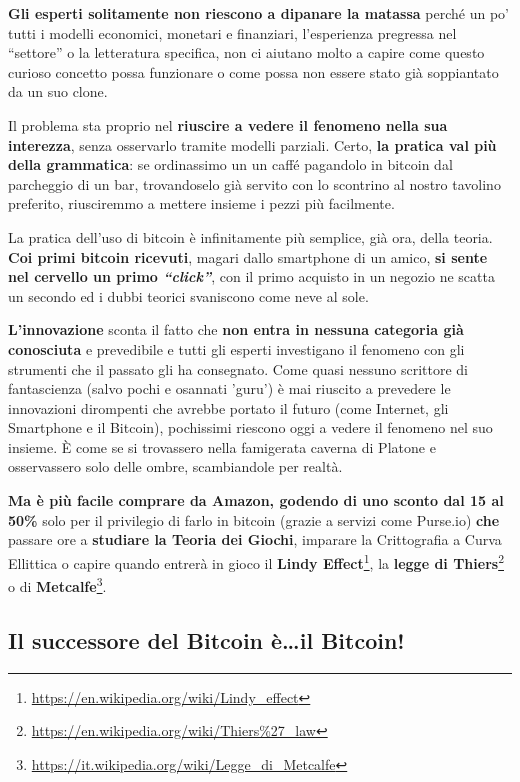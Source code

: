 \documentclass[a4paper,12pt,italian]{article}
\begin{document}
\textbf{Gli esperti solitamente non riescono a dipanare la matassa} perché un po’ tutti i modelli
economici, monetari e finanziari, l’esperienza pregressa nel “settore” o la letteratura specifica, non ci aiutano molto
a capire come questo curioso concetto possa funzionare o come possa non essere stato già soppiantato da un suo clone.


\bigskip


Il problema sta proprio nel \textbf{riuscire a vedere il fenomeno nella sua interezza}, senza
osservarlo tramite modelli parziali. Certo, \textbf{la pratica val più della grammatica}: se ordinassimo un 
un caffé pagandolo in bitcoin dal parcheggio di un bar, trovandoselo già servito con lo scontrino al
nostro tavolino preferito, riusciremmo a mettere insieme i pezzi più facilmente.


La pratica dell'uso di bitcoin è infinitamente più
semplice, già ora, della teoria. \textbf{Coi primi bitcoin ricevuti}, magari dallo smartphone di un
amico, \textbf{si sente nel cervello un primo \emph{“click”}}, con il primo acquisto in un
negozio ne scatta un secondo ed i dubbi teorici svaniscono come neve al sole.

\textbf{L’innovazione} sconta il fatto che \textbf{non entra in nessuna categoria già
conosciuta} e prevedibile e tutti gli esperti investigano il fenomeno con gli strumenti che il passato gli ha
consegnato. Come quasi nessuno scrittore di fantascienza (salvo pochi e osannati 'guru') è mai riuscito a prevedere le innovazioni dirompenti che avrebbe
portato il futuro (come Internet, gli Smartphone e il Bitcoin), pochissimi riescono oggi a vedere il fenomeno nel suo insieme.
È come se si trovassero nella famigerata caverna di Platone e osservassero solo delle ombre, scambiandole per realtà.

\bigskip


\textbf{Ma è più facile comprare da Amazon, godendo di uno sconto dal 15 al 50\%} solo per il privilegio di farlo
in bitcoin (grazie a servizi come Purse.io) \textbf{che} passare ore a \textbf{studiare la
Teoria dei Giochi}, imparare la Crittografia a Curva Ellittica o capire quando entrerà in gioco il
\textbf{Lindy Effect}\footnote{\url{https://en.wikipedia.org/wiki/Lindy_effect}},
 la \textbf{legge di Thiers}\footnote{\url{https://en.wikipedia.org/wiki/Thiers\%27_law}} o di
 \textbf{Metcalfe}\footnote{\url{https://it.wikipedia.org/wiki/Legge_di_Metcalfe}}.


\bigskip


\subsection*{Il successore del Bitcoin è\ldots il Bitcoin!}
\end{document}
